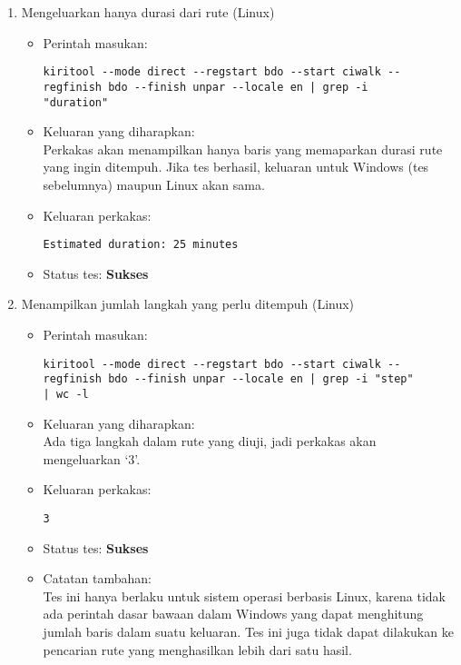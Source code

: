 \begin{enumerate}
	\item Mengeluarkan hanya durasi dari rute (Linux)
	\begin{itemize}
		\item Perintah masukan:
		\begin{lstlisting}
kiritool --mode direct --regstart bdo --start ciwalk --regfinish bdo --finish unpar --locale en | grep -i
"duration"
		\end{lstlisting}
		\item Keluaran yang diharapkan: \\
		Perkakas akan menampilkan hanya baris yang memaparkan durasi rute yang ingin ditempuh. Jika tes berhasil, keluaran untuk Windows (tes sebelumnya) maupun Linux akan sama.
		\item Keluaran perkakas:
		\begin{lstlisting}
Estimated duration: 25 minutes
		\end{lstlisting}
		\item Status tes: \textbf{Sukses}
	\end{itemize}
	
	\item Menampilkan jumlah langkah yang perlu ditempuh (Linux)
	\begin{itemize}
		\item Perintah masukan:
		\begin{lstlisting}
kiritool --mode direct --regstart bdo --start ciwalk --regfinish bdo --finish unpar --locale en | grep -i "step"
| wc -l
		\end{lstlisting}
		\item Keluaran yang diharapkan: \\
Ada tiga langkah dalam rute yang diuji, jadi perkakas akan mengeluarkan `3'.
		\item Keluaran perkakas:
		\begin{lstlisting}
3
		\end{lstlisting}
		\item Status tes: \textbf{Sukses}
		\item Catatan tambahan: \\
		Tes ini hanya berlaku untuk sistem operasi berbasis Linux, karena tidak ada perintah dasar bawaan dalam \cl Windows yang dapat menghitung jumlah baris dalam suatu keluaran. Tes ini juga tidak dapat dilakukan ke pencarian rute yang menghasilkan lebih dari satu hasil.
	\end{itemize}
	
\end{enumerate}
